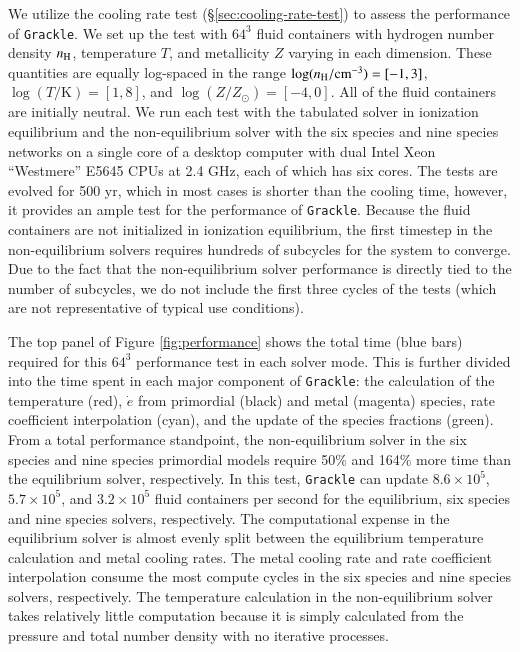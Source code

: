 We utilize the cooling rate test (\S\ref{sec:cooling-rate-test}) to
assess the performance of \texttt{Grackle}.  We set up the test with $64^3$
fluid containers with hydrogen number density $n_{\rm H}$, temperature
$T$, and metallicity $Z$ varying in each dimension.  These quantities
are equally log-spaced in the range $\log (n_{\rm H} /
\textrm{cm}^{-3}) = [-1, 3]$, $\log (T/\textrm{K}) = [1, 8]$, and
$\log (Z/Z_\odot) = [-4, 0]$.  All of the fluid containers are
initially neutral.  We run each test with the tabulated solver in
ionization equilibrium and the non-equilibrium solver with the
six species and nine species networks on a single core of a desktop
computer with dual Intel Xeon ``Westmere'' E5645 CPUs at 2.4 GHz, each
of which has six cores.  The tests are evolved for 500 yr, which in
most cases is shorter than the cooling time, however, it provides an
ample test for the performance of \texttt{Grackle}.  Because the fluid
containers are not initialized in ionization equilibrium, the first
timestep in the non-equilibrium solvers requires hundreds of subcycles
for the system to converge.  Due to the fact that the non-equilibrium solver
performance is directly tied to the number of subcycles, we do not
include the first three cycles of the tests (which are not representative of
typical use conditions).


The top panel of Figure \ref{fig:performance} shows the total time
(blue bars) required for this $64^3$ performance test in each solver
mode.  This is further divided into the time spent in each major
component of \texttt{Grackle}: the calculation of the temperature (red),
$\dot{e}$ from primordial (black) and metal (magenta) species, rate
coefficient interpolation (cyan), and the update of the species
fractions (green).  From a total performance standpoint, the
non-equilibrium solver in the six species and nine species primordial
models require 50\% and 164\% more time than the equilibrium solver,
respectively.  In this test, \texttt{Grackle} can update $8.6 \times 10^5$,
$5.7 \times 10^5$, and $3.2 \times 10^5$ fluid containers per second
for the equilibrium, six species and nine species solvers, respectively.
The computational expense in the equilibrium solver is almost evenly
split between the equilibrium temperature calculation and metal
cooling rates.  The metal cooling rate and rate coefficient
interpolation consume the most compute cycles in the six species and
nine species solvers, respectively.  The temperature calculation in the
non-equilibrium solver takes relatively little computation because it
is simply calculated from the pressure and total number density with
no iterative processes.

